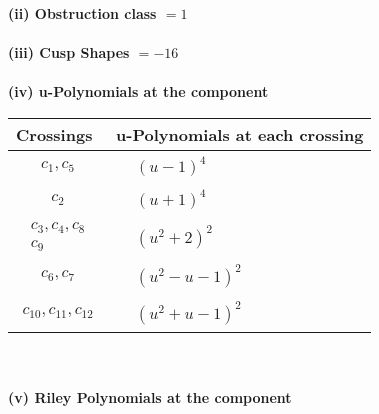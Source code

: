 \documentclass[1p]{elsarticle_modified}
\theoremstyle{definition}
\begin{document}
\flushleft \textbf{(ii) Obstruction class $= 1$}\\~\\
\flushleft \textbf{(iii) Cusp Shapes $= -16$}\\~\\
\newpage\renewcommand{\arraystretch}{1}
\flushleft \textbf{(iv) u-Polynomials at the component}\newline \\
\begin{tabular}{m{50pt}|m{274pt}}
Crossings & \hspace{64pt}u-Polynomials at each crossing \\
\hline $$\begin{aligned}c_{1},c_{5}\end{aligned}$$&$\begin{aligned}
&(u-1)^4
\end{aligned}$\\
\hline $$\begin{aligned}c_{2}\end{aligned}$$&$\begin{aligned}
&(u+1)^4
\end{aligned}$\\
\hline $$\begin{aligned}c_{3},c_{4},c_{8}\\c_{9}\end{aligned}$$&$\begin{aligned}
&(u^2+2)^2
\end{aligned}$\\
\hline $$\begin{aligned}c_{6},c_{7}\end{aligned}$$&$\begin{aligned}
&(u^2- u-1)^2
\end{aligned}$\\
\hline $$\begin{aligned}c_{10},c_{11},c_{12}\end{aligned}$$&$\begin{aligned}
&(u^2+u-1)^2
\end{aligned}$\\
\hline
\end{tabular}\\~\\
\newpage\renewcommand{\arraystretch}{1}
\flushleft \textbf{(v) Riley Polynomials at the component}\newline \\
\end{document}
